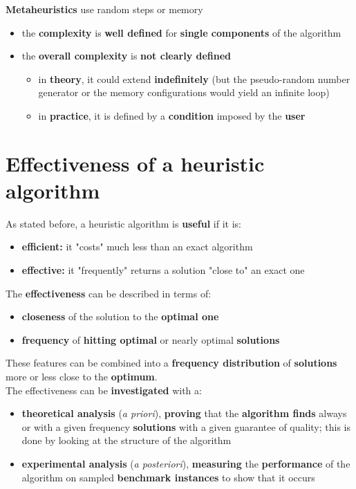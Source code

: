 \documentclass[11pt]{article}
\begin{document}
	\textbf{Metaheuristics} use random steps or memory
	\begin{itemize}
		\item the \textbf{complexity} is \textbf{well defined} for \textbf{single components} of the algorithm
		\item the \textbf{overall complexity} is \textbf{not clearly defined}
		\begin{itemize}
			\item in \textbf{theory}, it could extend \textbf{indefinitely} (but the pseudo-random number generator or the memory configurations would yield an infinite loop)
			\item in \textbf{practice}, it is defined by a \textbf{condition} imposed by the \textbf{user} 
		\end{itemize}
	\end{itemize}
	
	
	\newpage
	
	\section{Effectiveness of a heuristic algorithm}
	As stated before, a heuristic algorithm is \textbf{useful} if it is: 
	\begin{itemize}
		\item \textbf{efficient:} it "costs" much less than an exact algorithm
		\item \textbf{effective:} it "frequently" returns a solution "close to" an exact one
	\end{itemize}
	The \textbf{effectiveness} can be described in terms of: 
	\begin{itemize}
		\item \textbf{closeness} of the solution to the \textbf{optimal one} 
		\item \textbf{frequency} of \textbf{hitting optimal} or nearly optimal \textbf{solutions}
	\end{itemize}
	These features can be combined into a \textbf{frequency distribution} of \textbf{solutions} more or less close to the \textbf{optimum}.\\
	
	The effectiveness can be \textbf{investigated} with a: 
	\begin{itemize}
		\item \textbf{theoretical analysis} (\textit{a priori}), \textbf{proving} that the \textbf{algorithm finds} always or with a given frequency \textbf{solutions} with a given guarantee of quality; this is done by looking at the structure of the algorithm
		\item \textbf{experimental analysis} (\textit{a posteriori}), \textbf{measuring} the \textbf{performance} of the algorithm on sampled \textbf{benchmark instances} to show that it occurs
	\end{itemize}
	
\end{document}
